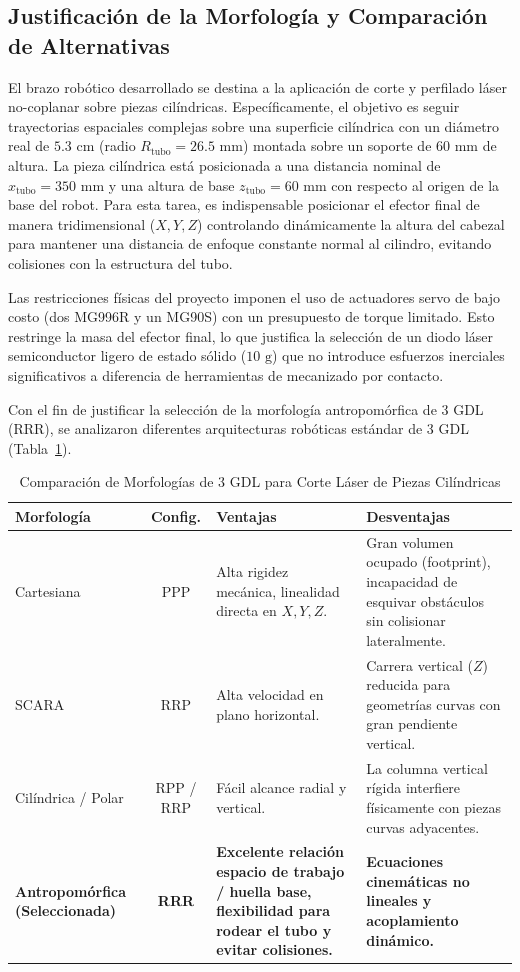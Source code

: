 \documentclass[conference,a4paper]{IEEEtran}
\begin{document}
\subsection{Justificación de la Morfología y Comparación de Alternativas}
El brazo robótico desarrollado se destina a la aplicación de corte y perfilado láser no-coplanar sobre piezas cilíndricas. Específicamente, el objetivo es seguir trayectorias espaciales complejas sobre una superficie cilíndrica con un diámetro real de $5.3\text{ cm}$ (radio $R_{\text{tubo}} = 26.5\text{ mm}$) montada sobre un soporte de $60\text{ mm}$ de altura. La pieza cilíndrica está posicionada a una distancia nominal de $x_{\text{tubo}} = 350\text{ mm}$ y una altura de base $z_{\text{tubo}} = 60\text{ mm}$ con respecto al origen de la base del robot. Para esta tarea, es indispensable posicionar el efector final de manera tridimensional ($X, Y, Z$) controlando dinámicamente la altura del cabezal para mantener una distancia de enfoque constante normal al cilindro, evitando colisiones con la estructura del tubo.

Las restricciones físicas del proyecto imponen el uso de actuadores servo de bajo costo (dos MG996R y un MG90S) con un presupuesto de torque limitado. Esto restringe la masa del efector final, lo que justifica la selección de un diodo láser semiconductor ligero de estado sólido ($10\text{ g}$) que no introduce esfuerzos inerciales significativos a diferencia de herramientas de mecanizado por contacto.

Con el fin de justificar la selección de la morfología antropomórfica de 3 GDL (RRR), se analizaron diferentes arquitecturas robóticas estándar de 3 GDL (Tabla~\ref{tab:comparacion_morfologia}).

\begin{table}[H]
\caption{Comparación de Morfologías de 3 GDL para Corte Láser de Piezas Cilíndricas}
\begin{center}
\footnotesize
\setlength{\tabcolsep}{3pt}
\begin{tabular}{p{2.0cm} c p{2.2cm} p{2.2cm}}
\toprule
\textbf{Morfología} & \textbf{Config.} & \textbf{Ventajas} & \textbf{Desventajas} \\
\midrule
Cartesiana & PPP & Alta rigidez mecánica, linealidad directa en $X,Y,Z$. & Gran volumen ocupado (footprint), incapacidad de esquivar obstáculos sin colisionar lateralmente. \\
\midrule
SCARA & RRP & Alta velocidad en plano horizontal. & Carrera vertical ($Z$) reducida para geometrías curvas con gran pendiente vertical. \\
\midrule
Cilíndrica / Polar & RPP / RRP & Fácil alcance radial y vertical. & La columna vertical rígida interfiere físicamente con piezas curvas adyacentes. \\
\midrule
\textbf{Antropomórfica (Seleccionada)} & \textbf{RRR} & \textbf{Excelente relación espacio de trabajo / huella base, flexibilidad para rodear el tubo y evitar colisiones.} & \textbf{Ecuaciones cinemáticas no lineales y acoplamiento dinámico.} \\
\bottomrule
\end{tabular}
\label{tab:comparacion_morfologia}
\end{center}
\end{table}
\end{document}
